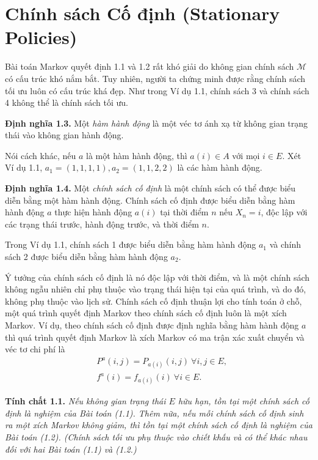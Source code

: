 \documentclass[12pt,a4paper]{report}
\begin{document}
    \section{Chính sách Cố định (Stationary Policies)}
    Bài toán Markov quyết định 1.1 và 1.2 rất khó giải do không gian chính sách $\mathcal{M}$ có cấu trúc khó nắm bắt. Tuy nhiên, người ta chứng minh được rằng chính sách tối ưu luôn có cấu trúc khá đẹp. Như trong Ví dụ 1.1, chính sách 3 và chính sách 4 không thể là chính sách tối ưu.
    
    \medskip
    \noindent
    \textbf{Định nghĩa 1.3.} Một \textit{hàm hành động} là một véc tơ ánh xạ từ không gian trạng thái vào không gian hành động.
    
    \medskip
    Nói cách khác, nếu $a$ là một hàm hành động, thì $a(i) \in A$ với mọi $i\in E$. Xét Ví dụ 1.1, $a_1=(1,1,1,1), a_2=(1,1,2,2)$ là các hàm hành động.
    
    
     
    \medskip
    \noindent
    \textbf{Định nghĩa 1.4.} Một \textit{chính sách cố định} là một chính sách có thể được biểu diễn bằng một hàm hành động. Chính sách cố định được biểu diễn bằng hàm hành động $a$ thực hiện hành động $a(i)$ tại thời điểm $n$ nếu $X_n=i$, độc lập với các trạng thái trước, hành động trước, và thời điểm $n$. 
   
     
    \medskip
    Trong Ví dụ 1.1, chính sách 1 được biểu diễn bằng hàm hành động $a_1$ và chính sách 2 được biểu diễn bằng hàm hành động $a_2$.
    
    \medskip
    Ý tưởng của chính sách cố định là nó độc lập với thời điểm, và là một chính sách không ngẫu nhiên chỉ phụ thuộc vào trạng thái hiện tại của quá trình, và do đó, không phụ thuộc vào lịch sử. Chính sách cố định thuận lợi cho tính toán ở chỗ, một quá trình quyết định Markov theo chính sách cố định luôn là một xích Markov. Ví dụ, theo chính sách cố định được định nghĩa bằng hàm hành động $a$ thì quá trình quyết định Markov là xích Markov có ma trận xác xuất chuyển và véc tơ chi phí là
    \begin{align}
    &P^a(i,j)=P_{a(i)}(i,j) \ \forall i,j \in E,\\
    &f^a(i)=f_{a(i)}(i) \  \forall i\in E.
    \end{align} 
    
  
   \begin{shaded*}
   	\noindent
     \textbf{Tính chất 1.1.} \textit{ Nếu không gian trạng thái $E$ hữu hạn, tồn tại một chính sách cố định là nghiệm của Bài toán (1.1). Thêm nữa, nếu mỗi chính sách cố định sinh ra một xích Markov không giảm, thì tồn tại một chính sách cố định là nghiệm của Bài toán (1.2). (Chính sách tối ưu phụ thuộc vào chiết khấu và có thể khác nhau đối với hai Bài toán (1.1) và (1.2.) }
   \end{shaded*}
   
\end{document}
